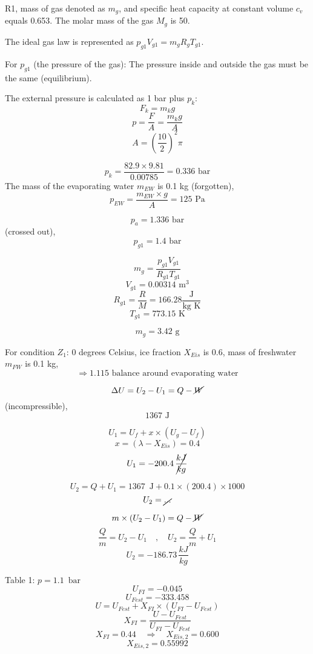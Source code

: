 R1, mass of gas denoted as \( m_g \), and specific heat capacity at constant volume \( c_v \) equals 0.653. The molar mass of the gas \( M_g \) is 50.

The ideal gas law is represented as \( p_{g1} V_{g1} = m_{g} R_{g} T_{g1} \).

For \( p_{g1} \) (the pressure of the gas): The pressure inside and outside the gas must be the same (equilibrium).

The external pressure is calculated as 1 bar plus \( p_k \):
\[ F_k = m_k g \]
\[ p = \frac{F}{A} = \frac{m_k g}{A} \]
\[ A = \left( \frac{10}{2} \right)^2 \pi \]

\[ p_k = \frac{82.9 \times 9.81}{0.00785} = 0.336 \text{ bar} \]
The mass of the evaporating water \( m_{EW} \) is 0.1 kg (forgotten),
\[ p_{EW} = \frac{m_{EW} \times g}{A} = 125 \text{ Pa} \]

\[ p_a = 1.336 \text{ bar} \] (crossed out),
\[ p_{g1} = 1.4 \text{ bar} \]

\[ m_g = \frac{p_{g1} V_{g1}}{R_{g1} T_{g1}} \]
\[ V_{g1} = 0.00314 \text{ m}^3 \]
\[ R_{g1} = \frac{R}{M} = 166.28 \frac{\text{J}}{\text{kg K}} \]
\[ T_{g1} = 773.15 \text{ K} \]

\[ m_g = 3.42 \text{ g} \]

For condition \( Z_1 \): 0 degrees Celsius, ice fraction \( X_{Eis} \) is 0.6, mass of freshwater \( m_{FW} \) is 0.1 kg,
\[ \Rightarrow 1.115 \text{ balance around evaporating water} \]

\[ \Delta U = U_2 - U_1 = Q - \cancel{W} \] (incompressible),
\[ 1367 \text{ J} \]

\[ U_1 = U_f + x \times (U_g - U_f) \]
\[ x = (\lambda - X_{Eis}) = 0.4 \]
\[ U_1 = -200.4 \, \cancel{\frac{kJ}{kg}} \]

\[ U_2 = Q + U_1 = 1367 \, \text{ J} + 0.1 \times (200.4) \times 1000 \]
\[ U_2 = \cancel{\text{...}} \]

\[ m \times (U_2 - U_1) = Q - \cancel{W} \]
\[ \frac{Q}{m} = U_2 - U_1 \quad , \quad U_2 = \frac{Q}{m} + U_1 \]
\[ U_2 = -186.73 \, \frac{kJ}{kg} \]

Table 1: \( p = 1.1 \, \text{ bar} \)
\[ U_{FI} = -0.045 \]
\[ U_{Fest} = -333.458 \]
\[ U = U_{Fest} + X_{FI} \times (U_{FI} - U_{Fest}) \]
\[ X_{FI} = \frac{U - U_{Fest}}{U_{FI} - U_{Fest}} \]
\[ X_{FI} = 0.44 \quad \Rightarrow \quad X_{Eis,2} = 0.600 \]
\[ X_{Eis,2} = 0.55992 \]